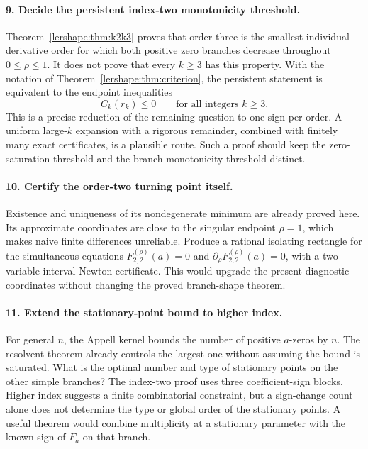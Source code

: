 \documentclass[11pt,a4paper]{article}
\numberwithin{equation}{section}
\theoremstyle{definition}
\theoremstyle{remark}
\begin{document}
\paragraph{9. Decide the persistent index-two monotonicity threshold.}
Theorem~\ref{lershape:thm:k2k3} proves that order three is the smallest
individual derivative order for which both positive zero branches
decrease throughout $0\le\rho\le1$. It does not prove that every
$k\ge3$ has this property. With the notation of
Theorem~\ref{lershape:thm:criterion}, the persistent statement is
equivalent to the endpoint inequalities
\[
 C_k(r_k)\le0\qquad\text{for all integers }k\ge3.
\]
This is a precise reduction of the remaining question to one sign per
order. A uniform large-$k$ expansion with a rigorous remainder,
combined with finitely many exact certificates, is a plausible route.
Such a proof should keep the zero-saturation threshold and the
branch-monotonicity threshold distinct.

\paragraph{10. Certify the order-two turning point itself.}
Existence and uniqueness of its nondegenerate minimum are already
proved here. Its approximate coordinates are close to the singular
endpoint $\rho=1$, which makes naive finite differences unreliable.
Produce a rational isolating rectangle for the simultaneous equations
$F_{2,2}^{(\rho)}(a)=0$ and
$\partial_\rho F_{2,2}^{(\rho)}(a)=0$, with a two-variable interval
Newton certificate. This would upgrade the present diagnostic
coordinates without changing the proved branch-shape theorem.

\paragraph{11. Extend the stationary-point bound to higher index.}
For general $n$, the Appell kernel bounds the number of positive
$a$-zeros by $n$. The resolvent theorem already controls the largest
one without assuming the bound is saturated. What is the optimal
number and type of stationary points on the other simple branches?
The index-two proof uses three coefficient-sign blocks. Higher index
suggests a finite combinatorial constraint, but a sign-change count
alone does not determine the type or global order of the stationary
points. A useful theorem would combine multiplicity at a stationary
parameter with the known sign of $F_a$ on that branch.
\end{document}
